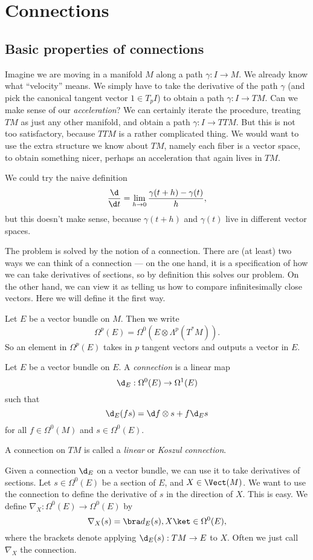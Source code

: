 \documentclass[a4paper]{article}
\begin{document}
\section{Connections}
\subsection{Basic properties of connections}
Imagine we are moving in a manifold $M$ along a path $\gamma: I \to M$. We already know what ``velocity'' means. We simply have to take the derivative of the path $\gamma$ (and pick the canonical tangent vector $1 \in T_p I$) to obtain a path $\gamma: I \to TM$. Can we make sense of our \emph{acceleration}? We can certainly iterate the procedure, treating $TM$ as just any other manifold, and obtain a path $\gamma: I \to TTM$. But this is not too satisfactory, because $TTM$ is a rather complicated thing. We would want to use the extra structure we know about $TM$, namely each fiber is a vector space, to obtain something nicer, perhaps an acceleration that again lives in $TM$.

We could try the naive definition
\[
  \frac{\d}{\d t} = \lim_{h \to 0} \frac{\gamma(t + h) - \gamma(t)}{h},
\]
but this doesn't make sense, because $\gamma(t + h)$ and $\gamma(t)$ live in different vector spaces. %

The problem is solved by the notion of a connection. There are (at least) two ways we can think of a connection --- on the one hand, it is a specification of how we can take derivatives of sections, so by definition this solves our problem. On the other hand, we can view it as telling us how to compare infinitesimally close vectors. Here we will define it the first way.

\begin{notation}
  Let $E$ be a vector bundle on $M$. Then we write
  \[
    \Omega^p(E) = \Omega^0(E \otimes \Lambda^p (T^* M)).
  \]
  So an element in $\Omega^p(E)$ takes in $p$ tangent vectors and outputs a vector in $E$.
\end{notation}

\begin{defi}[Connection]
  Let $E$ be a vector bundle on $E$. A \emph{connection} is a linear map
  \[
    \d_E: \Omega^0(E) \to \Omega^1(E)
  \]
  such that
  \[
    \d_E (fs) = \d f \otimes s + f \d_E s
  \]
  for all $f \in \Omega^0(M)$ and $s \in \Omega^0(E)$.

  A connection on $TM$ is called a \emph{linear} or \emph{Koszul connection}.
\end{defi}
Given a connection $\d_E$ on a vector bundle, we can use it to take derivatives of sections. Let $s \in \Omega^0(E)$ be a section of $E$, and $X \in \Vect(M)$. We want to use the connection to define the derivative of $s$ in the direction of $X$. This is easy. We define $\nabla_X: \Omega^0(E) \to \Omega^0(E)$ by
\[
  \nabla_X(s) = \bra d_E(s), X \ket \in \Omega^0(E),
\]
where the brackets denote applying $\d_E(s): TM \to E$ to $X$. Often we just call $\nabla_X$ the connection.
\end{document}
